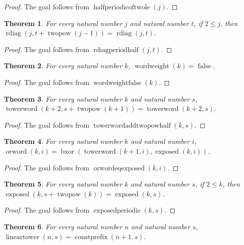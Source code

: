 \documentclass[11pt]{article}
\newtheorem{theorem}{Theorem}[section]
\theoremstyle{definition}
\begin{document}
\begin{proof}
The goal follows from \(\operatorname{halfperiodicoftwole}(j)\).
\end{proof}
\begin{theorem}
\label{ll:observations:rdiag-period-half}
For every natural number \(j\) and natural number \(t\), if \(2 \le j\), then \(\operatorname{rdiag}(j, t + \operatorname{twopow}(j - 1)) = \operatorname{rdiag}(j, t)\).
\end{theorem}
\begin{proof}
The goal follows from \(\operatorname{rdiagperiodhalf}(j, t)\).
\end{proof}
\begin{theorem}
\label{ll:observations:word-weight-false}
For every natural number \(k\), \(\operatorname{wordweight}(k) = \operatorname{false}\).
\end{theorem}
\begin{proof}
The goal follows from \(\operatorname{wordweightfalse}(k)\).
\end{proof}
\begin{theorem}
\label{ll:observations:tower-word-add-twopow-half}
For every natural number \(k\) and natural number \(s\), \(\operatorname{towerword}(k + 2, s + \operatorname{twopow}(k + 1)) = \operatorname{towerword}(k + 2, s)\).
\end{theorem}
\begin{proof}
The goal follows from \(\operatorname{towerwordaddtwopowhalf}(k, s)\).
\end{proof}
\begin{theorem}
\label{ll:observations:or-word-eq-exposed}
For every natural number \(k\) and natural number \(i\), \(\operatorname{orword}(k, i) = \operatorname{bxor}(\operatorname{towerword}(k + 1, i), \operatorname{exposed}(k, i))\).
\end{theorem}
\begin{proof}
The goal follows from \(\operatorname{orwordeqexposed}(k, i)\).
\end{proof}
\begin{theorem}
\label{ll:observations:exposed-periodic}
For every natural number \(k\) and natural number \(s\), if \(2 \le k\), then \(\operatorname{exposed}(k, s + \operatorname{twopow}(k)) = \operatorname{exposed}(k, s)\).
\end{theorem}
\begin{proof}
The goal follows from \(\operatorname{exposedperiodic}(k, s)\).
\end{proof}
\begin{theorem}
\label{ll:observations:linear-tower-eq-const-prefix}
For every natural number \(n\) and natural number \(s\), \(\operatorname{lineartower}(n, s) = \operatorname{constprefix}(n + 1, s)\).
\end{theorem}
\end{document}
